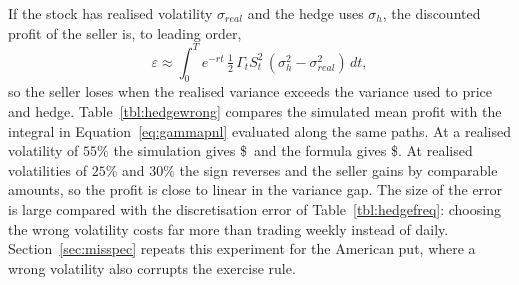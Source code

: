 If the stock has realised volatility $\sigma_{real}$ and the hedge uses $\sigma_h$, the discounted profit of the seller is, to leading order,
\begin{equation}\label{eq:gammapnl}
 \varepsilon\approx\int_0^Te^{-rt}\,\tfrac12\,\Gamma_t S_t^2\,(\sigma_h^2-\sigma_{real}^2)\,dt,
\end{equation}
so the seller loses when the realised variance exceeds the variance used to price and hedge.
Table~\ref{tbl:hedgewrong} compares the simulated mean profit with the integral in Equation~\eqref{eq:gammapnl} evaluated along the same paths.
At a realised volatility of $55\%$ the simulation gives \$\WrongVolLoss\ and the formula gives \$\WrongVolTheory.
At realised volatilities of $25\%$ and $30\%$ the sign reverses and the seller gains by comparable amounts, so the profit is close to linear in the variance gap.
The size of the error is large compared with the discretisation error of Table~\ref{tbl:hedgefreq}: choosing the wrong volatility costs far more than trading weekly instead of daily.
Section~\ref{sec:misspec} repeats this experiment for the American put, where a wrong volatility also corrupts the exercise rule.
